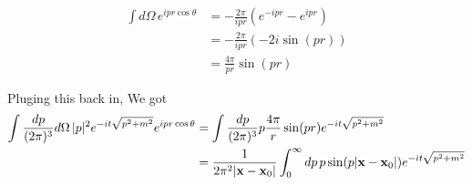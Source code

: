 \begin{align*}
\int d\Omega \, e^{ipr\cos\theta} &= 
    -\frac{2\pi}{ipr} \left( e^{-ipr} - e^{ipr} \right) \\
&= -\frac{2\pi}{ipr} \left(-2i \sin(pr) \right) \\
&= \frac{4\pi}{pr} \sin(pr)
\end{align*}

Pluging this back in,
We got
\begin{align*}
\int \frac{dp}{(2\pi)^3} d\Omega \, |p|^2 e^{-it\sqrt{p^2 + m^2}} e^{ipr\cos\theta} &=
\int \frac{dp}{(2\pi)^3} p \frac{4\pi}{r} \sin(pr) e^{-it\sqrt{p^2 + m^2}} \\
&= \frac{1}{2\pi^2 |\boldsymbol{\mathbf{x}}-\boldsymbol{\mathbf{x}}_0|}
    \int_{0}^{\infty} dp \, p \sin(p|\boldsymbol{\mathbf{x}}-\boldsymbol{\mathbf{x}}_0|) e^{-it\sqrt{p^2 + m^2}}
\end{align*}
